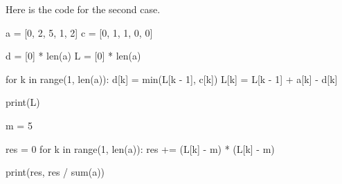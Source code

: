 \begin{exercise}
\begin{solution}
Here is the code for the second case. 
\begin{pyconsole}
a = [0, 2, 5, 1, 2]
c = [0, 1, 1, 0, 0]

d = [0] * len(a)
L = [0] * len(a)

for k in range(1, len(a)):
    d[k] = min(L[k - 1], c[k])
    L[k] = L[k - 1] + a[k] - d[k]

print(L)

m = 5

res = 0
for k in range(1, len(a)):
    res += (L[k] - m) * (L[k] - m)

print(res, res / sum(a))
\end{pyconsole}

\end{solution}
\end{exercise}






 



